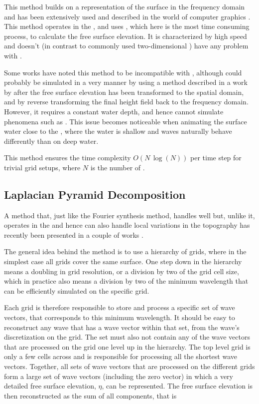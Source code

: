 This method \citep{Mastin1987} builds on  a representation of the surface in the frequency domain and has been extensively used and described in the world of computer graphics \citep{Monnier}. This method operates in the , and uses \FFT, which here is the most time consuming process, to calculate the free surface elevation. It is characterized by high speed and doesn't (in contrast to commonly used two-dimensional \PDEs) have any problem with .

Some works have noted this method to be incompatible with \FSI \citep{Chentanez2011a}, although \FSI could probably be simulated in a very \approximating manner by using a method described in a work by \citet{Ottosson2011} after the free surface elevation has been transformed to the spatial domain, and by reverse transforming the final height field back to the frequency domain. However, it requires a constant water depth, and hence cannot simulate phenomena such as . This issue becomes noticeable when animating the surface water close to the , where the water is shallow and waves naturally behave differently than on deep water.

This method ensures the time complexity $O(N\,\log(N))$ per time step for trivial grid setups, where $N$ is the number of .

\subsection{Laplacian Pyramid Decomposition}
\label{sec:lacplacian_pyramid_decomposition}

A method that, just like the Fourier synthesis method, handles  well but, unlike it, operates in the  and hence can also handle local variations in the topography has recently been presented in a couple of works \citep{Ottosson2011,Lennartsson2012}.

The general idea behind the method is to use a hierarchy of grids, where in the simplest case all grids cover the same surface. One step down in the hierarchy means a doubling in grid resolution, or a division by two of the grid cell size, which in practice also means a division by two of the minimum wavelength that can be efficiently simulated on the specific grid.

Each grid is therefore responsible to store and process a specific set of wave vectors, that corresponds to this minimum wavelength. It should be easy to reconstruct any wave that has a wave vector within that set, from the wave's discretization on the grid. The set must also not contain any of the wave vectors that are processed on the grid one level up in the hierarchy. The top level grid is only a few cells across and is responsible for processing all the shortest wave vectors. Together, all sets of wave vectors that are processed on the different grids form a large set of wave vectors (including the zero vector) in which a very detailed free surface elevation, $\eta$, can be represented. The free surface elevation is then reconstructed as the sum of all components, that is

